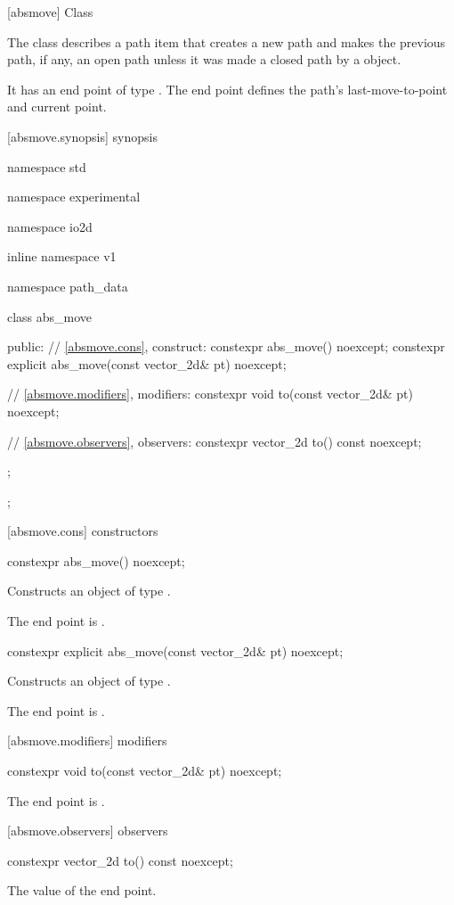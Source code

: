  [absmove] {Class }

\pnum
{}
The class  describes a path item that creates a new path and makes the previous path, if any, an open path unless it was made a closed path by a  object.

\pnum
It has an end point of type . The end point defines the path's last-move-to-point and current point.

 [absmove.synopsis] { synopsis}

\begin{codeblock}
namespace std { namespace experimental { namespace io2d { inline namespace v1 {
  namespace path_data {
    class abs_move {
    public:
      // \ref{absmove.cons}, construct:
      constexpr abs_move() noexcept;
      constexpr explicit abs_move(const vector_2d& pt) noexcept;

      // \ref{absmove.modifiers}, modifiers:
      constexpr void to(const vector_2d& pt) noexcept;

      // \ref{absmove.observers}, observers:
      constexpr vector_2d to() const noexcept;
    };
  };
} } } }
\end{codeblock}

 [absmove.cons] { constructors}

\begin{itemdecl}
constexpr abs_move() noexcept;
\end{itemdecl}
\begin{itemdescr}
\pnum
\effects
Constructs an object of type .

\pnum
The end point is .
\end{itemdescr}

\begin{itemdecl}
constexpr explicit abs_move(const vector_2d& pt) noexcept;
\end{itemdecl}
\begin{itemdescr}
\pnum
\effects
Constructs an object of type .

\pnum
The end point is .
\end{itemdescr}

 [absmove.modifiers]{ modifiers}

\begin{itemdecl}
constexpr void to(const vector_2d& pt) noexcept;
\end{itemdecl}
\begin{itemdescr}
\pnum
\effects
The end point is .
\end{itemdescr}

 [absmove.observers]{ observers}

\begin{itemdecl}
constexpr vector_2d to() const noexcept;
\end{itemdecl}
\begin{itemdescr}
\pnum
\returns
The value of the end point.
\end{itemdescr}
